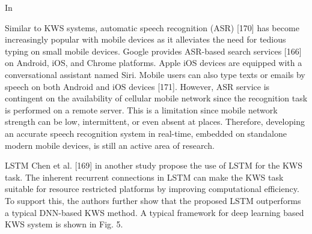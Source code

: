 In \cite{tang2018deep}

Similar to KWS systems, automatic speech recognition (ASR) [170] has become increasingly popular with mobile devices as it alleviates the need for tedious typing on small mobile devices. Google provides ASR-based search services [166] on Android, iOS, and Chrome platforms. Apple iOS devices are equipped with a conversational assistant named Siri. Mobile users can also type texts or emails by speech on both Android and iOS devices [171]. However, ASR service is contingent on the availability of cellular mobile network since the recognition task is performed on a remote server. This is a limitation since mobile network strength can be low, intermittent, or even absent at places. Therefore, developing an accurate speech recognition system in real-time, embedded on standalone modern mobile devices, is still an active area of research.




LSTM
Chen et al. [169] in another study propose the use of LSTM for the KWS task. The inherent recurrent connections in LSTM can make the KWS task suitable for resource restricted platforms by improving computational efficiency. To support this, the authors further show that the proposed LSTM outperforms a typical DNN-based KWS method. A typical framework for deep learning based KWS system is shown in Fig. 5.

